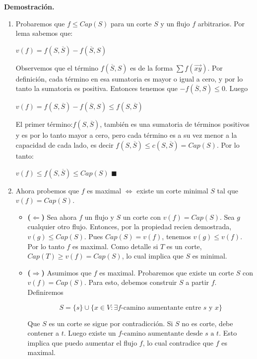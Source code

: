 \documentclass[11pt, a4paper]{article}
\theoremstyle{definition}
\begin{document}
\textbf{Demostración.}
    \begin{enumerate}
        \item Probaremos que $f\leq Cap(S)$ para un corte $S$ y un flujo $f$ arbitrarios. Por lema sabemos que:
        \begin{center}
            $v(f)=f(S,\overline{S})-f(\overline{S},S)$
        \end{center}
        Observemos que el término $f(\overline{S},S)$ es de la forma $\sum f(\overrightarrow{xy})$. Por definición, cada término en esa sumatoria
        es mayor o igual a cero, y por lo tanto la sumatoria es positiva. Entonces tenemos que $-f(\overline{S},S) \leq 0$. Luego
        \begin{center}
            $v(f)=f(S,\overline{S})-f(\overline{S},S) \leq f(S,\overline{S})$
        \end{center}
        El primer término:$f(S,\overline{S})$, también es una sumatoria de términos positivos y es por lo tanto mayor a cero, pero cada término es 
        a su vez menor a la capacidad de cada lado, es decir $f(S,\overline{S})\leq c(S,\overline{S})=Cap(S)$. Por lo tanto:
        \begin{center}
            $v(f)\leq f(S,\overline{S})\leq Cap(S)$ $\blacksquare$
        \end{center}
        \item Ahora probemos que $f$ es maximal $\Longleftrightarrow$ existe un corte minimal $S$ tal que $v(f)=Cap(S)$.
        \begin{itemize}
            \item \textbf{($\Leftarrow$)} Sea ahora $f$ un flujo y $S$ un corte con $v(f)=Cap(S)$. Sea $g$ cualquier otro flujo. Entonces, por la 
                propiedad recien demostrada, $v(g)\leq Cap(S)$. Pues $Cap(S)=v(f)$, tenemos $v(g)\leq v(f)$. Por lo tanto $f$ es maximal. Como 
                detalle si $T$ es un corte, $Cap(T)\geq v(f)=Cap(S)$, lo cual implica que $S$ es minimal.
            \item \textbf{($\Rightarrow$)} Asumimos que \( f \) es maximal. Probaremos que existe un corte \( S \) con \( v(f) = C a p(S) \). 
            Para esto, debemos construir \( S \) a partir \( f \). Definiremos

            \[ S = \{s\} \cup \{ x \in V : \exists f\text{-camino aumentante entre } s \text{ y } x \} \]
            
            Que \( S \) es un corte se sigue por contradicción. Si \( S \) no es corte, debe contener a \( t \). 
            Luego existe un \( f\text{-camino aumentante desde } s \text{ a } t \). 
            Esto implica que puedo aumentar el flujo \( f \), lo cual contradice que \( f \) es maximal. 
            

\end{itemize}
\end{enumerate}
\end{document}

